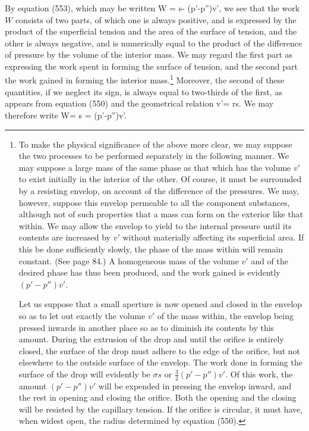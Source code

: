 \documentclass[12pt]{article}
\begin{document}
{By equation (553), which may be written
\eqs W = \sigma s- (p'-p'')v', \label{559}\eqe
we see that the work $W$ consists of two parts, of which one is always positive, and is expressed by the product of the superficial tension and the area of the surface of tension, and the other is always negative, and is numerically equal to the product of the difference of pressure by the volume of the interior mass. We may regard the first part as expressing the work spent in forming the surface of tension, and the second part the work gained in forming the interior mass.\footnote{To make the physical significance of the above more clear, we may suppose the two processes to be performed separately in the following manner. We may suppose a large mass of the same phase as that which has the volume $v'$ to exist initially in the interior of the other. Of course, it must be surrounded by a resisting envelop, on account of the difference of the pressures. We may, however, suppose this envelop permeable to all the component substances, although not of such properties that a mass can form on the exterior like that within. We may allow the envelop to yield to the internal pressure until its contents are increased by $v'$ without materially affecting its superficial area. If this be done sufficiently slowly, the phase of the mass within will remain constant. (See page 84.) A homogeneous mass of the volume $v'$ and of the desired phase has thus been produced, and the work gained is evidently $(p' -p'')v'$. \par
Let us suppose that a small aperture is now opened and closed in the envelop so as to let out exactly the volume $v'$ of the mass within, the envelop being pressed inwards in another place so as to diminish its contents by this amount. During the extrusion of the drop and until the orifice is entirely closed, the surface of the drop must adhere to the edge of the orifice, but not elsewhere to the outside surface of the envelop. The work done in forming the surface of the drop will evidently be $\sigma s$ or $\frac{3}{2}(p'-p'')v'$. Of this work, the amount $(p'-p'')v'$ will be expended in pressing the envelop inward, and the rest in opening and closing the orifice. Both the opening and the closing will be resisted by the capillary tension. If the orifice is circular, it must have, when widest open, the radius determined by equation (550).} Moreover, the second of these quantities, if we neglect its sign, is always equal to two-thirds of the first, as appears from equation (550) and the geometrical relation v'= rs. We may therefore write
\eqs  W= \sigma s = (p'-p'')v'. \label{560}\eqe
}
\end{document}

